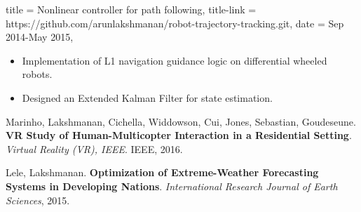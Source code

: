 \documentclass{simplecv}
\begin{document}
\begin{position}
  {
      title   = Nonlinear controller for path following,
      title-link = https://github.com/arunlakshmanan/robot-trajectory-tracking.git,
      date    = Sep 2014-May 2015,
  }

\begin{itemize}
    \item Implementation of L1 navigation guidance logic on differential wheeled robots.
    \item Designed an Extended Kalman Filter for state estimation.

\end{itemize}
\end{position}

\renewcommand\refname{Publications}
\begin{thebibliography}{9}

    Marinho, Lakshmanan, Cichella, Widdowson, Cui, Jones, Sebastian, Goudeseune.
    \textbf{VR Study of Human-Multicopter Interaction in a Residential Setting}.
    \textit{Virtual Reality (VR), IEEE}. IEEE, 2016.

    Lele, Lakshmanan.
    \textbf{Optimization of Extreme-Weather Forecasting Systems in Developing Nations}.
    \textit{International Research Journal of Earth Sciences}, 2015.
\end{thebibliography}
\vfill \vfill
\newpage
\end{document}
